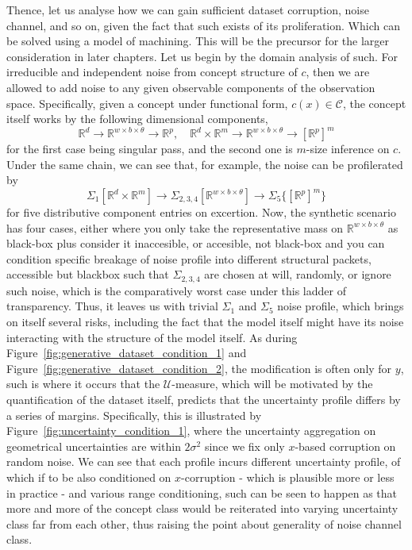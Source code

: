Thence, let us analyse how we can gain sufficient dataset corruption, noise channel, and so on, given the fact that such exists of its proliferation. Which can be solved using a model of machining. This will be the precursor for the larger consideration in later chapters. Let us begin by the domain analysis of such. For irreducible and independent noise from concept structure of $c$, then we are allowed to add noise to any given observable components of the observation space. Specifically, given a concept under functional form, $c(x)\in\mathcal{C}$, the concept itself works by the following dimensional components,
\begin{equation}
    \mathbb{R}^{d}\to \mathbb{R}^{w\times b\times \theta} \to \mathbb{R}^{p}, \quad \mathbb{R}^{d}\times\mathbb{R}^{m} \to \mathbb{R}^{w\times b\times \theta} \to [\mathbb{R}^{p}]^{m}
\end{equation}
for the first case being singular pass, and the second one is $m$-size inference on $c$. Under the same chain, we can see that, for example, the noise can be profilerated by
\begin{equation}
    \Sigma_{1}[\mathbb{R}^{d}\times\mathbb{R}^{m}] \to \Sigma_{2,3,4}[\mathbb{R}^{w\times b\times \theta}] \to \Sigma_{5}\Big\{[\mathbb{R}^{p}]^{m}\Big\}
\end{equation}
for five distributive component entries on excertion. Now, the synthetic scenario has four cases, either where you only take the representative mass on $\mathbb{R}^{w\times b\times \theta}$ as black-box plus consider it inaccesible, or accesible, not black-box and you can condition specific breakage of noise profile into different structural packets, accessible but blackbox such that $\Sigma_{2,3,4}$ are chosen at will, randomly, or ignore such noise, which is the comparatively worst case under this ladder of transparency. Thus, it leaves us with trivial $\Sigma_{1}$ and $\Sigma_{5}$ noise profile, which brings on itself several risks, including the fact that the model itself might have its noise interacting with the structure of the model itself. As during Figure~\ref{fig:generative_dataset_condition_1} and Figure~\ref{fig:generative_dataset_condition_2}, the modification is often only for $y$, such is where it occurs that the $\mathcal{U}$-measure, which will be motivated by the quantification of the dataset itself, predicts that the uncertainty profile differs by a series of margins. Specifically, this is illustrated by Figure~\ref{fig:uncertainty_condition_1}, where the uncertainty aggregation on geometrical uncertainties are within $2\sigma^{2}$ since we fix only $x$-based corruption on random noise. We can see that each profile incurs different uncertainty profile, of which if to be also conditioned on $x$-corruption - which is plausible more or less in practice - and various range conditioning, such can be seen to happen as that more and more of the concept class would be reiterated into varying uncertainty class far from each other, thus raising the point about generality of noise channel class. 
